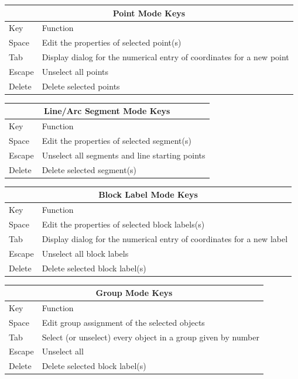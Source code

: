 \documentclass[12pt]{report}
\begin{document}
\begin{table}
\centering
\begin{tabular}{|l|l|} \hline \hline
\multicolumn{2}{|c|}{Point Mode Keys} \\ \hline \hline
 Key    & Function \\ \hline \hline
 Space  & Edit the properties of selected point(s) \\ \hline
 Tab    & Display dialog for the numerical entry of coordinates for a new point \\ \hline
 Escape & Unselect all points \\ \hline
 Delete & Delete selected points \\ \hline \hline
\end{tabular}

\vspace*{12pt}
\begin{tabular}{|l|l|} \hline \hline
\multicolumn{2}{|c|}{Line/Arc Segment Mode Keys} \\ \hline \hline
 Key    & Function \\ \hline \hline
 Space  & Edit the properties of selected segment(s) \\ \hline
 Escape & Unselect all segments and line starting points \\ \hline
 Delete & Delete selected segment(s) \\ \hline \hline
\end{tabular}

\vspace*{12pt}
\begin{tabular}{|l|l|} \hline \hline
\multicolumn{2}{|c|}{Block Label Mode Keys} \\ \hline \hline
 Key    & Function \\ \hline \hline
 Space  & Edit the properties of selected block labels(s) \\ \hline
 Tab    & Display dialog for the numerical entry of coordinates for a new label \\ \hline
 Escape & Unselect all block labels  \\ \hline
 Delete & Delete selected block label(s) \\ \hline \hline
\end{tabular}

\vspace*{12pt}
\begin{tabular}{|l|l|} \hline \hline
\multicolumn{2}{|c|}{Group Mode Keys} \\ \hline \hline
 Key    & Function \\ \hline \hline
 Space  & Edit group assignment of the selected objects \\ \hline
 Tab    & Select (or unselect) every object in a group given by number \\ \hline
 Escape & Unselect all  \\ \hline
 Delete & Delete selected block label(s) \\ \hline \hline
\end{tabular}


\end{table}
\end{document}
